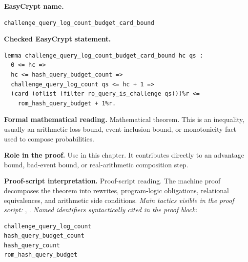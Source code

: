 \begin{formaltheorem}
\noindent\textbf{EasyCrypt name.}
\begin{lstlisting}[language=EasyCrypt,basicstyle=\ttfamily\scriptsize]
challenge_query_log_count_budget_card_bound
\end{lstlisting}
\noindent\textbf{Checked EasyCrypt statement.}
\begin{lstlisting}[language=EasyCrypt,basicstyle=\ttfamily\scriptsize]
lemma challenge_query_log_count_budget_card_bound hc qs :
  0 <= hc =>
  hc <= hash_query_budget_count =>
  challenge_query_log_count qs <= hc + 1 =>
  (card (oflist (filter ro_query_is_challenge qs)))%r <=
    rom_hash_query_budget + 1%r.
\end{lstlisting}
\noindent\textbf{Formal mathematical reading.}
Mathematical theorem. This is an inequality, usually an arithmetic loss bound, event inclusion bound, or monotonicity fact used to compose probabilities.

\noindent\textbf{Role in the proof.}
Use in this chapter. It contributes directly to an advantage bound, bad-event bound, or real-arithmetic composition step.

\noindent\textbf{Proof-script interpretation.}
Proof-script reading. The machine proof decomposes the theorem into rewrites, program-logic obligations, relational equivalences, and arithmetic side conditions.
\emph{Main tactics visible in the proof script:} , .
\emph{Named identifiers syntactically cited in the proof block:}
\begin{lstlisting}[language=EasyCrypt,basicstyle=\ttfamily\scriptsize]
challenge_query_log_count
hash_query_budget_count
hash_query_count
rom_hash_query_budget
\end{lstlisting}

\end{formaltheorem}

